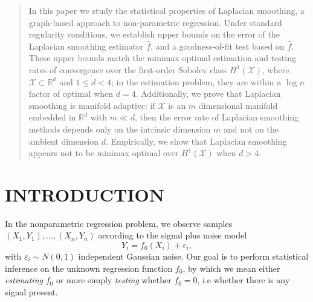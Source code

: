 \documentclass[twoside]{article}
\newcommand{\Reals}{\mathbb{R}}
\newcommand{\1}{\mathbf{1}}
\newcommand{\Rd}{\Reals^d}
\newcommand{\Xset}{\mathcal{X}}
\newcommand{\wh}[1]{\widehat{#1}}
\theoremstyle{definition}
\theoremstyle{remark}
\begin{document}
	
	

\begin{abstract}
	In this paper we study the statistical properties of Laplacian smoothing, a graph-based approach to non-parametric regression. Under standard regularity conditions, we establish upper bounds on the error of the Laplacian smoothing estimator $\wh{f}$, and a goodness-of-fit test based on $\wh{f}$. These upper bounds match the minimax optimal estimation and testing rates of convergence over the first-order Sobolev class $H^1(\Xset)$, where $\Xset \subset \Rd$ and $1 \leq d < 4$; in the estimation problem, they are within a $\log n$ factor of optimal when $d = 4$. Additionally, we prove that Laplacian smoothing is manifold adaptive: if $\Xset$ is an $m$ dimensional manifold embedded in $\Reals^d$ with $m \ll d$, then the error rate of Laplacian smoothing methods depends only on the intrinsic dimension $m$ and not on the ambient dimension $d$. Empirically, we show that Laplacian smoothing appears not to be minimax optimal over $H^1(\Xset)$ when $d > 4$. 
\end{abstract}

\section{INTRODUCTION}
In the nonparametric regression problem, we observe samples $(X_1,Y_1),\ldots,(X_n,Y_n)$ according to the signal plus noise model
\begin{equation}
\label{eqn:signal_plus_noise_model}
Y_i = f_{0}(X_i) + \varepsilon_i,
\end{equation}
with $\varepsilon_i \sim N(0,1)$ independent Gaussian noise. Our goal is to perform statistical inference on the unknown regression function $f_0$, by which we mean either \emph{estimating} $f_0$ or more simply \emph{testing} whether $f_0 = 0$, i.e whether there is any signal present. 
\end{document}
